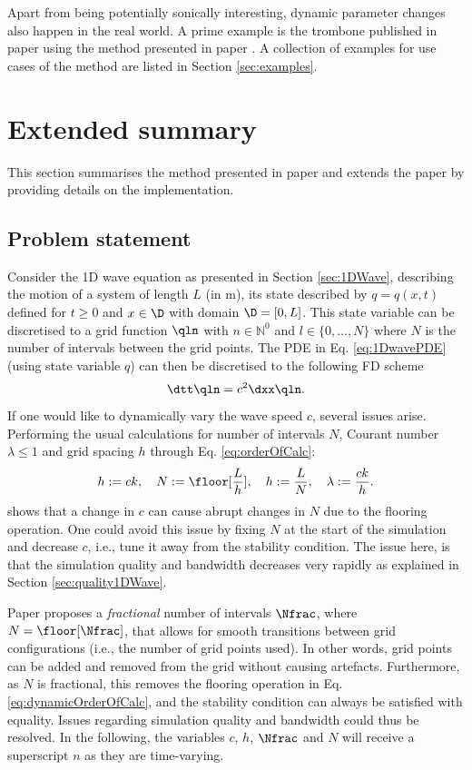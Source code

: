 Apart from being potentially sonically interesting, dynamic parameter changes also happen in the real world. A prime example is the trombone published in paper \citeP[H] using the method presented in paper \citeP[G]. A collection of examples for use cases of the method are listed in Section \ref{sec:examples}.

\section{Extended summary}
This section summarises the method presented in paper \citeP[G] and extends the paper by providing details on the implementation. 

\subsection{Problem statement}
Consider the 1D wave equation  as presented in Section \ref{sec:1DWave}, describing the motion of a system of length $L$ (in m), its state described by $q = q(x,t)$ defined for $t\geq 0$ and $x\in\D$ with domain $\D = [0, L]$. This state variable can be discretised to a grid function $\qln$ with $n\in \mathbb{N}^0$ and $l \in \{0, \hdots, N\}$ where $N$ is the number of intervals between the grid points. The PDE in Eq. \eqref{eq:1DwavePDE} (using state variable $q$) can then be discretised to the following FD scheme
\begin{equation}\label{eq:1DWaveDynamic}
    \dtt \qln = c^2\dxx \qln.
\end{equation}
If one would like to dynamically vary the wave speed $c$, several issues arise. Performing the usual calculations for number of intervals $N$, Courant number $\lambda\leq 1$ and grid spacing $h$ through Eq. \eqref{eq:orderOfCalc}:
\begin{equation}\label{eq:dynamicOrderOfCalc}
    h := ck, \quad N := \floor[\frac{L}{h}], \quad h := \frac{L}{N}, \quad \lambda := \frac{ck}{h}.
\end{equation}
shows that a change in $c$ can cause abrupt changes in $N$ due to the flooring operation. One could avoid this issue by fixing $N$ at the start of the simulation and decrease $c$, i.e., tune it away from the stability condition. The issue here, is that the simulation quality and bandwidth decreases very rapidly as explained in Section \ref{sec:quality1DWave}. 

Paper \citeP[G] proposes a \textit{fractional} number of intervals $\Nfrac$, where $N = \floor[\Nfrac]$, that allows for smooth transitions between grid configurations (i.e., the number of grid points used). In other words, grid points can be added and removed from the grid without causing artefacts. Furthermore, as $N$ is fractional, this removes the flooring operation in Eq. \eqref{eq:dynamicOrderOfCalc}, and the stability condition can always be satisfied with equality. Issues regarding simulation quality and bandwidth could thus be resolved. In the following, the variables $c$, $h$, $\Nfrac$ and $N$ will receive a superscript $n$ as they are time-varying.

